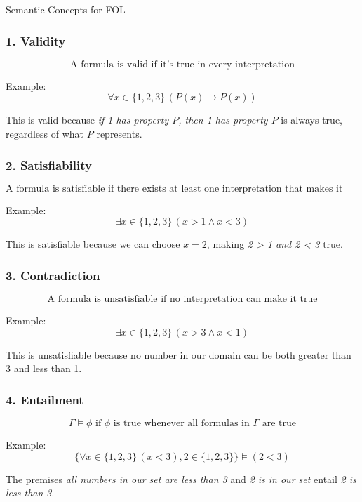Semantic Concepts for FOL

\subsubsection{1. Validity}\label{validity}

\[\text{A formula is valid if it's true in every interpretation}\]

Example: \[\forall x \in \{1,2,3\} \, (P(x) \rightarrow P(x))\]

This is valid because \emph{if 1 has property \(P\), then 1 has property
\(P\)} is always true, regardless of what \(P\) represents.

\subsubsection{2. Satisfiability}\label{satisfiability}

\[\text{A formula is satisfiable if there exists at least one interpretation that makes it true}\]

Example: \[\exists x \in \{1,2,3\} \, (x > 1 \wedge x < 3)\]

This is satisfiable because we can choose \(x = 2\), making \emph{2
\textgreater{} 1 and 2 \textless{} 3} true.

\subsubsection{3. Contradiction}\label{contradiction}

\[\text{A formula is unsatisfiable if no interpretation can make it true}\]

Example: \[\exists x \in \{1,2,3\} \, (x > 3 \wedge x < 1)\]

This is unsatisfiable because no number in our domain can be both
greater than 3 and less than 1.

\subsubsection{4. Entailment}\label{entailment}

\[\Gamma \models \phi \text{ if } \phi \text{ is true whenever all formulas in } \Gamma \text{ are true}\]

Example:
\[\{\forall x \in \{1,2,3\} \, (x < 3), 2 \in \{1,2,3\}\} \models (2 < 3)\]

The premises \emph{all numbers in our set are less than 3} and \emph{2
is in our set} entail \emph{2 is less than 3}.

